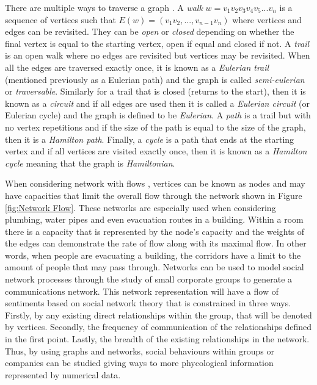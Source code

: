 There are multiple ways to traverse a graph \cite{rahman2017basic}. A \emph{walk} $w = v_1v_2v_3v_4v_5...v_n$ is a sequence of vertices such that $E(w) = (v_1v_2,...,v_{n-1}v_n)$ where vertices and edges can be revisited. They can be \emph{open} or \emph{closed} depending on whether the final vertex is equal to the starting vertex, open if equal and closed if not. A \emph{trail} is an open walk where no edges are revisited but vertices may be revisited. When all the edges are traversed exactly once, it is known as a \emph{Eulerian trail} (mentioned previously as a Eulerian path) and the graph is called \emph{semi-eulerian} or \emph{traversable}. Similarly for a trail that is closed (returns to the start), then it is known as a \emph{circuit} and if all edges are used then it is called a \emph{Eulerian circuit} (or Eulerian cycle) and the graph is defined to be \emph{Eulerian}. A \emph{path} is a trail but with no vertex repetitions and if the size of the path is equal to the size of the graph, then it is a \emph{Hamilton path}. Finally, a \emph{cycle} is a path that ends at the starting vertex and if all vertices are visited exactly once, then it is known as a \emph{Hamilton cycle} meaning that the graph is \emph{Hamiltonian}.
\newline

When considering network with flows \cite{ford1956network}, vertices can be known as nodes and may have capacities that limit the overall flow through the network shown in Figure \ref{fig:Network Flow}. These networks are especially used when considering plumbing, water pipes and even evacuation routes in a building. Within a room there is a capacity that is represented by the node's capacity and the weights of the edges can demonstrate the rate of flow along with its maximal flow. In other words, when people are evacuating a building, the corridors have a limit to the amount of people that may pass through. Networks can be used to model social network processes through the study of small corporate groups to generate a communications network. This network representation will have a flow of sentiments based on social network theory \cite{ZACHARY1984259} that is constrained in three ways. Firstly, by any existing direct relationships within the group, that will be denoted by vertices. Secondly, the frequency of communication of the relationships defined in the first point. Lastly, the breadth of the existing relationships in the network. Thus, by using graphs and networks, social behaviours within groups or companies can be studied giving ways to more phycological information represented by numerical data.

